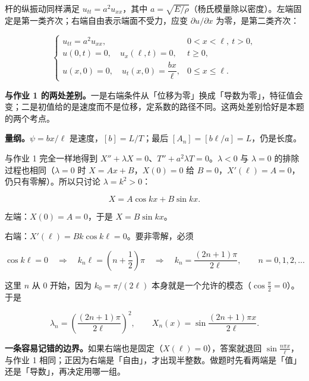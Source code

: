 \documentclass[11pt]{ctexart}
\let\orighdr\hdr
\renewcommand{\hdr}[2]{\par\needspace{7\baselineskip}\orighdr{#1}{#2}}
\begin{document}
\label{sec:q2}



杆的纵振动同样满足 $u_{tt}=a^2u_{xx}$，其中 $a=\sqrt{E/\rho}$（杨氏模量除以密度）。左端固定是第一类齐次；右端自由表示端面不受力，应变 $\partial u/\partial x$ 为零，是第二类齐次：

\[
\begin{cases}
u_{tt}=a^2u_{xx}, & 0<x<\ell,\ t>0,\\[2pt]
u(0,t)=0,\quad u_x(\ell,t)=0, & t\ge0,\\[2pt]
u(x,0)=0,\quad u_t(x,0)=\dfrac{bx}{\ell}, & 0\le x\le\ell .
\end{cases}
\]

\textbf{与作业 1 的两处差别。}一是右端条件从「位移为零」换成「导数为零」，特征值会变；二是初值给的是速度而不是位移，定系数的路径不同。这两处差别恰好是本题的两个考点。

\textbf{量纲。}$\psi=bx/\ell$ 是速度，$[b]=L/T$；最后 $[A_n]=[b\ell/a]=L$，仍是长度。


与作业 1 完全一样地得到 $X''+\lambda X=0$、$T''+a^2\lambda T=0$。$\lambda<0$ 与 $\lambda=0$ 的排除过程也相同（$\lambda=0$ 时 $X=Ax+B$，$X(0)=0$ 给 $B=0$，$X'(\ell)=A=0$，仍只有零解）。所以只讨论 $\lambda=k^2>0$：

\[
X=A\cos kx+B\sin kx .
\]

左端：$X(0)=A=0$，于是 $X=B\sin kx$。

右端：$X'(\ell)=Bk\cos k\ell=0$。要非零解，必须

\[
\cos k\ell=0
\quad\Longrightarrow\quad
k_n\ell=\left(n+\frac12\right)\pi
\quad\Longrightarrow\quad
k_n=\frac{(2n+1)\pi}{2\ell},
\qquad n=0,1,2,\dots
\]

这里 $n$ 从 $0$ 开始，因为 $k_0=\pi/(2\ell)$ 本身就是一个允许的模态（$\cos\frac{\pi}{2}=0$）。于是

\[
\lambda_n=\left(\frac{(2n+1)\pi}{2\ell}\right)^2,
\qquad
X_n(x)=\sin\frac{(2n+1)\pi x}{2\ell}.
\]

\textbf{一条容易记错的边界。}如果右端也是固定（$X(\ell)=0$），答案就退回 $\sin\frac{n\pi x}{\ell}$，与作业 1 相同；正因为右端是「自由」，才出现半整数。做题时先看两端是「值」还是「导数」，再决定用哪一组。
\end{document}
